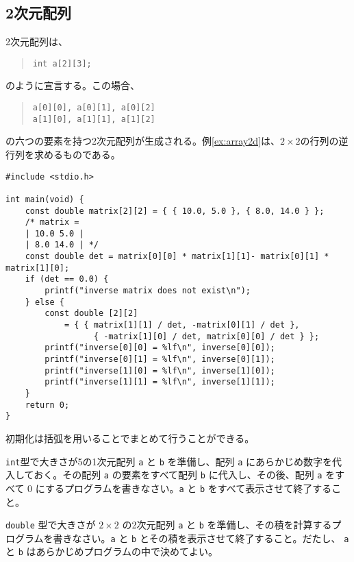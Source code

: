 \subsection{2次元配列}
2次元配列は、
\begin{quote}
    \begin{verbatim}
int a[2][3];
\end{verbatim}
\end{quote}
のように宣言する。この場合、
\begin{quote}
    \begin{verbatim}
a[0][0], a[0][1], a[0][2]
a[1][0], a[1][1], a[1][2]
\end{verbatim}
\end{quote}
の六つの要素を持つ2次元配列が生成される。例\ref{ex:array2d}は、\(2 \times 2\)の行列の逆行列を求めるものである。
\begin{reidai}\label{ex:array2d}
    \begin{verbatim}
#include <stdio.h>

int main(void) {
    const double matrix[2][2] = { { 10.0, 5.0 }, { 8.0, 14.0 } };
    /* matrix =
    | 10.0 5.0 |
    | 8.0 14.0 | */
    const double det = matrix[0][0] * matrix[1][1]- matrix[0][1] * matrix[1][0];
    if (det == 0.0) {
        printf("inverse matrix does not exist\n");
    } else {
        const double [2][2]
            = { { matrix[1][1] / det, -matrix[0][1] / det },
                  { -matrix[1][0] / det, matrix[0][0] / det } };
        printf("inverse[0][0] = %lf\n", inverse[0][0]);
        printf("inverse[0][1] = %lf\n", inverse[0][1]);
        printf("inverse[1][0] = %lf\n", inverse[1][0]);
        printf("inverse[1][1] = %lf\n", inverse[1][1]);
    }
    return 0;
}
\end{verbatim}
\end{reidai}
初期化は括弧を用いることでまとめて行うことができる。

\begin{renshuu}\label{prob:3-1}
    \texttt{int}型で大きさが5の1次元配列 \texttt{a} と \texttt{b} を準備し、配列 \texttt{a} にあらかじめ数字を代入しておく。その配列 \texttt{a} の要素をすべて配列 \texttt{b} に代入し、その後、配列 \texttt{a} をすべて 0 にするプログラムを書きなさい。\texttt{a} と \texttt{b} をすべて表示させて終了すること。
\end{renshuu}

\begin{renshuu}\label{prob:3-2}
    \texttt{double} 型で大きさが \(2\times2\) の2次元配列 \texttt{a} と \texttt{b} を準備し、その積を計算するプログラムを書きなさい。\texttt{a} と \texttt{b} とその積を表示させて終了すること。だたし、 \texttt{a} と \texttt{b} はあらかじめプログラムの中で決めてよい。
\end{renshuu}

